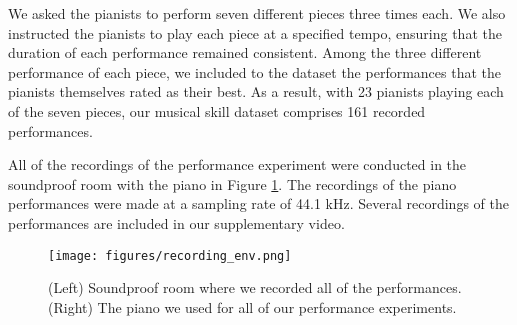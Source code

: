 We asked the pianists to perform seven different pieces three times each.
We also instructed the pianists to play each piece at a specified tempo, ensuring that the duration of each performance remained consistent.
Among the three different performance of each piece, we included to the dataset the performances that the pianists themselves rated as their best. 
As a result, with 23 pianists playing each of the seven pieces, our musical skill dataset comprises 161 recorded performances. 

All of the recordings of the performance experiment were conducted in the soundproof room with the piano in Figure \ref{recording_env}.
The recordings of the piano performances were made at a sampling rate of 44.1 kHz. 
Several recordings of the performances are included in our supplementary video.

\begin{figure}[h]
  \centering
  \texttt{[image: figures/recording\_env.png]}
  \caption{(Left) Soundproof room where we recorded all of the performances. (Right) The piano we used for all of our performance experiments.}
  \Description{}
  \label{recording_env}
\end{figure}

